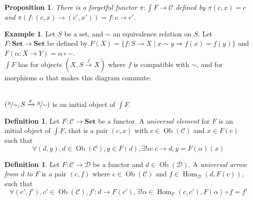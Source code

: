 \documentclass{article}
\newcommand{\cat}{\mathcal{C}}
\newcommand{\catt}{\mathcal{D}}
\newcommand{\Set}{\mathbf{Set}}
\DeclareMathOperator{\Ob}{Ob}
\DeclareMathOperator{\Hom}{Hom}
\newcommand{\esh}{{\textstyle \int}}
\theoremstyle{plain}
\newtheorem{proposition}[theorem]{Proposition}
\theoremstyle{definition}
\newtheorem{definition}[theorem]{Definition}
\newtheorem{example}[theorem]{Example}
\theoremstyle{remark}
\begin{document}
\begin{proposition}
    There is a forgetful functor $\pi : \esh F \to \cat$ defined by $\pi(c,x) = c$ and $\pi(f : (c,x) \to (c',x')) = f : c\to c'$.
\end{proposition}

\begin{example}
    Let $S$ be a set, and $\sim$ an equivalence relation on $S$. Let $F : \Set \to \Set$ be defined by $F(X) = \{f : S \to X \mid x \sim y \Rightarrow f(x) = f(y)\}$ and $F(\alpha : X \to Y) = \alpha \circ -$. \\
    $\esh F$ has for objects $(X, S\xrightarrow{f}X)$ where $f$ is compatible with $\sim$, and for morphisms $\alpha$ that makes this diagram commute:  \\
    $(\nicefrac{S}{\sim}, S\xrightarrow{\pi} \nicefrac{S}{\sim})$ is an initial object of $\esh F$.
\end{example}

\begin{definition}
    Let $F : \cat \to \Set$ be a functor. A \emph{universal element} for $F$ is an initial object of $\esh F$, that is a pair $(c,x)$ with $c \in \Ob(\cat)$ and $x \in F(c)$ such that
    \[\forall (d,y), d \in \Ob(\cat), y \in F(d), \exists! \alpha : c\to d, y= F(\alpha)(x)\]
\end{definition}

\begin{definition}
    Let $F : \cat \to \catt$ be a functor and $d \in \Ob(\catt)$. A \emph{universal arrow from $d$ to $F$} is a pair $(c,f)$ where $c \in \Ob(\cat)$ and $f \in \Hom_{\catt} (d,F(c))$, such that
    \[\forall (c',f'), c' \in \Ob(\cat), f' : d \to F(c'), \exists! \alpha \in \Hom_\cat(c,c'), F(\alpha) \circ f = f'\]
    \begin{center}
    \end{center}
\end{definition}
\end{document}
